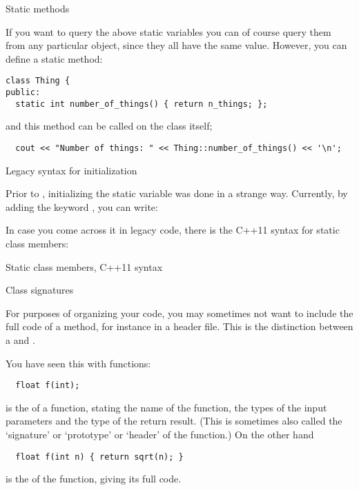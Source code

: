  {Static methods}

If you want to query the above static variables
you can of course query them from any particular object,
since they all have the same value.
However, you can define a static method:
\begin{lstlisting}
class Thing {
public:
  static int number_of_things() { return n_things; };
\end{lstlisting}
and this method can be called on the class itself;
\begin{lstlisting}
  cout << "Number of things: " << Thing::number_of_things() << '\n';
\end{lstlisting}

 {Legacy syntax for initialization}

Prior to , initializing the static variable was
done in a strange way. Currently, by adding the keyword ,
you can write:


\begin{comment}
  \Level 1 {Static members}
  \begin{block}{Static class members}
    \label{sl:static-member}
    A static member acts as if it's shared between all objects.\\
    (Note: C++17 syntax)
    \snippetwithoutput{classstatic17}{link}{static17}
  \end{block}
\end{comment}

In case you come across it in legacy code,
there is the C++11 syntax for static class members:

\begin{block}{Static class members, C++11 syntax}
  \label{sl:static-member11}
  \lstset{style=snippetcode}
\end{block}

 {Class signatures}
\label{sec:class-decl-defn}

For purposes of organizing your code,
you may sometimes not want to include the full code of a method,
for instance in a header file.
This is the distinction between a 
and .

You have seen this with functions:
\begin{lstlisting}
  float f(int);
\end{lstlisting}
is the  of a function,
stating the name of the function, the types of the input parameters
and the type of the return result.
(This is sometimes also called the `signature' or `prototype' or `header'
of the function.)
On the other hand
\begin{lstlisting}
  float f(int n) { return sqrt(n); }
\end{lstlisting}
is the  of the function, giving its full code.

